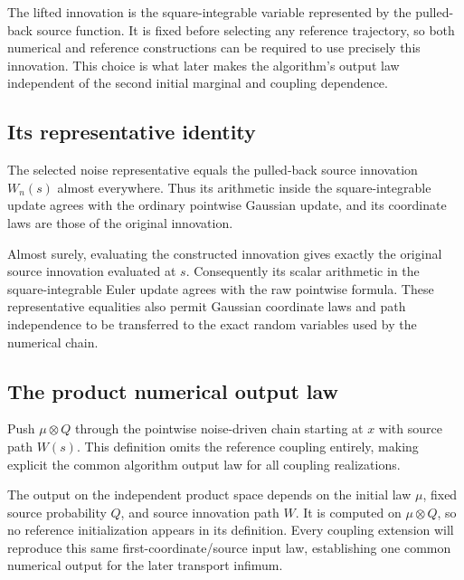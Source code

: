 \documentclass[11pt,a4paper]{report}
\begin{document}
The lifted innovation is the square-integrable variable represented by the pulled-back source function. It is fixed before selecting any reference trajectory, so both numerical and reference constructions can be required to use precisely this innovation. This choice is what later makes the algorithm's output law independent of the second initial marginal and coupling dependence.

\subsection{\texorpdfstring{Its representative identity}{Its representative identity}}
\label{report-step-UnadjustedLangevin-ProductReference-lean-5}


The selected noise representative equals the pulled-back source innovation \(W_n(s)\) almost everywhere. Thus its arithmetic inside the square-integrable update agrees with the ordinary pointwise Gaussian update, and its coordinate laws are those of the original innovation.



Almost surely, evaluating the constructed innovation gives exactly the original source innovation evaluated at \(s\). Consequently its scalar arithmetic in the square-integrable Euler update agrees with the raw pointwise formula. These representative equalities also permit Gaussian coordinate laws and path independence to be transferred to the exact random variables used by the numerical chain.

\subsection{\texorpdfstring{The product numerical output law}{The product numerical output law}}
\label{report-step-UnadjustedLangevin-ProductReference-lean-6}


Push \(\mu\otimes Q\) through the pointwise noise-driven chain starting at \(x\) with source path \(W(s)\). This definition omits the reference coupling entirely, making explicit the common algorithm output law for all coupling realizations.



The output on the independent product space depends on the initial law \(\mu\), fixed source probability \(Q\), and source innovation path \(W\). It is computed on \(\mu\otimes Q\), so no reference initialization appears in its definition. Every coupling extension will reproduce this same first-coordinate/\allowbreak{}source input law, establishing one common numerical output for the later transport infimum.
\end{document}
